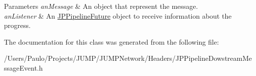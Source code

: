 \begin{DoxyParams}{Parameters}
{\em anMessage} & An object that represent the message. \\
\hline
{\em anListener} & An \hyperlink{a00088}{JPPipelineFuture} object to receive information about the progress. \\
\hline
\end{DoxyParams}


The documentation for this class was generated from the following file:\begin{DoxyCompactItemize}
\item 
/Users/Paulo/Projects/JUMP/JUMPNetwork/Headers/JPPipelineDowstreamMessageEvent.h\end{DoxyCompactItemize}
